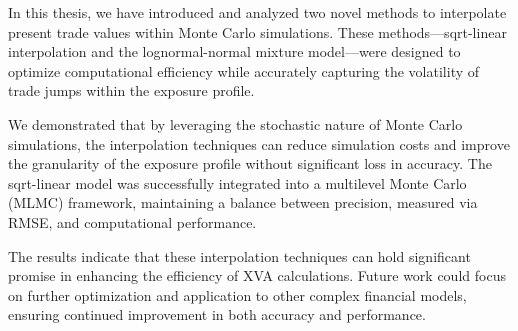 \documentclass{article}
\begin{document}
In this thesis, we have introduced and analyzed two novel methods to interpolate present trade values within Monte Carlo simulations. These methods—sqrt-linear interpolation and the lognormal-normal mixture model—were designed to optimize computational efficiency while accurately capturing the volatility of trade jumps within the exposure profile.

We demonstrated that by leveraging the stochastic nature of Monte Carlo simulations, the interpolation techniques can reduce simulation costs and improve the granularity of the exposure profile without significant loss in accuracy. The sqrt-linear model was successfully integrated into a multilevel Monte Carlo (MLMC) framework, maintaining a balance between precision, measured via RMSE, and computational performance.

The results indicate that these interpolation techniques can hold significant promise in enhancing the efficiency of XVA calculations. Future work could focus on further optimization and application to other complex financial models, ensuring continued improvement in both accuracy and performance.

\newpage
\nocite{*}


\end{document}
